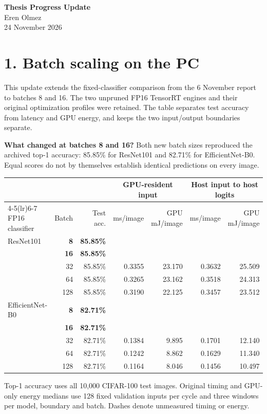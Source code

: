 \documentclass[10pt,a4paper]{article}
\newcommand{\heading}[1]{\section*{\color{navy}#1}}
\newcommand{\smallcap}[1]{{\footnotesize\color{navy}#1}\par}
\newcommand{\missing}{\textemdash}
\newcommand{\newbatch}[2]{ & \textbf{#1} & \textbf{#2\%} & \missing & \missing & \missing & \missing\\}
\providecommand{\RoutedProgressUpdate}{1}
\begin{document}
\begin{center}
{\Large\bfseries\color{navy}Thesis Progress Update}\\[3 pt]
{Eren Olmez}\\{24 November 2026}
\end{center}\vspace{-8 pt}

\ifdefined\RoutedProgressUpdate

\else
\heading{1. Batch scaling on the PC}
This update extends the fixed-classifier comparison from the 6 November report to batches 8 and 16. The two unpruned FP16 TensorRT engines and their original optimization profiles were retained. The table separates test accuracy from latency and GPU energy, and keeps the two input/output boundaries separate.

\textbf{What changed at batches 8 and 16?}
Both new batch sizes reproduced the archived top-1 accuracy: 85.85\% for ResNet101 and 82.71\% for EfficientNet-B0. Equal scores do not by themselves establish identical predictions on every image.

\begin{center}\small
\begin{tabular}{@{}lrrrrrr@{}}\toprule
 & & & \multicolumn{2}{c}{GPU-resident input} & \multicolumn{2}{c}{Host input to host logits}\\
\cmidrule(lr){4-5}\cmidrule(lr){6-7}
FP16 classifier & Batch & Test acc. & ms/image & GPU mJ/image & ms/image & GPU mJ/image\\
\midrule
ResNet101 \newbatch{8}{85.85}
\newbatch{16}{85.85}
 & 32 & 85.85\% & 0.3355 & 23.170 & 0.3632 & 25.509\\
 & 64 & 85.85\% & 0.3265 & 23.162 & 0.3518 & 24.313\\
 & 128 & 85.85\% & 0.3190 & 22.125 & 0.3457 & 23.512\\
\addlinespace[2pt]
EfficientNet-B0 \newbatch{8}{82.71}
\newbatch{16}{82.71}
 & 32 & 82.71\% & 0.1384 & 9.895 & 0.1701 & 12.140\\
 & 64 & 82.71\% & 0.1242 & 8.862 & 0.1629 & 11.340\\
 & 128 & 82.71\% & 0.1164 & 8.046 & 0.1456 & 10.497\\
\bottomrule\end{tabular}
\end{center}
\smallcap{Top-1 accuracy uses all 10,000 CIFAR-100 test images. Original timing and GPU-only energy medians use 128 fixed validation inputs per cycle and three windows per model, boundary and batch. Dashes denote unmeasured timing or energy.}
\end{document}
